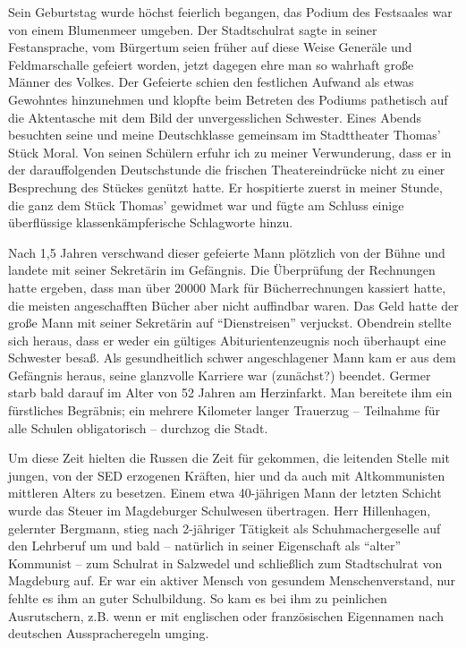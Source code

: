 \documentclass[a5paper,pagesize,10pt,twoside=true]{scrbook}
\renewcommand{\marginpar}[2][]{}
\begin{document}
Sein Geburtstag wurde höchst feierlich begangen, das Podium des Festsaales war von einem Blumenmeer umgeben. Der Stadtschulrat sagte in seiner Festansprache, vom Bürgertum seien früher auf diese Weise Generäle und Feldmarschalle gefeiert worden, jetzt dagegen ehre man so wahrhaft große Männer des Volkes. Der Gefeierte schien den festlichen Aufwand als etwas Gewohntes hinzunehmen und klopfte beim Betreten des Podiums pathetisch auf die Aktentasche mit dem Bild der unvergesslichen Schwester. \marginpar{148} Eines Abends besuchten seine und meine Deutschklasse gemeinsam im Stadttheater Thomas' Stück Moral. Von seinen Schülern erfuhr ich zu meiner Verwunderung, dass er in der darauffolgenden Deutschstunde die frischen Theatereindrücke nicht zu einer Besprechung des Stückes genützt hatte. Er hospitierte zuerst in meiner Stunde, die ganz dem Stück Thomas' gewidmet war und fügte am Schluss einige überflüssige klassenkämpferische Schlagworte hinzu.

Nach 1,5 Jahren verschwand dieser gefeierte Mann plötzlich von der Bühne und landete mit seiner Sekretärin im Gefängnis. Die Überprüfung der Rechnungen hatte ergeben, dass man über \num{20000} Mark für Bücherrechnungen kassiert hatte, die meisten angeschafften Bücher aber nicht auffindbar waren. Das Geld hatte der große Mann mit seiner Sekretärin auf \enquote{Dienstreisen} verjuckst. Obendrein stellte sich heraus, dass er weder ein gültiges Abiturientenzeugnis noch überhaupt eine Schwester besaß. Als gesundheitlich schwer angeschlagener Mann kam er aus dem Gefängnis heraus, seine glanzvolle Karriere war (zunächst?) beendet. Germer starb bald darauf im Alter von 52 Jahren am Herzinfarkt. Man bereitete ihm \marginpar{149} ein fürstliches Begräbnis; ein mehrere Kilometer langer Trauerzug -- Teilnahme für alle Schulen obligatorisch -- durchzog die Stadt.

Um diese Zeit hielten die Russen die Zeit für gekommen, die leitenden Stelle mit jungen, von der SED erzogenen Kräften, hier und da auch mit Altkommunisten mittleren Alters zu besetzen. Einem etwa 40-jährigen Mann der letzten Schicht wurde das Steuer im Magdeburger Schulwesen übertragen. Herr Hillenhagen, gelernter Bergmann, stieg nach 2-jähriger Tätigkeit als Schuhmachergeselle auf den Lehrberuf um und bald -- natürlich in seiner Eigenschaft als \enquote{alter} Kommunist -- zum Schulrat in Salzwedel und schließlich zum Stadtschulrat von Magdeburg auf. Er war ein aktiver Mensch von gesundem Menschenverstand, nur fehlte es ihm an guter Schulbildung. So kam es bei ihm zu peinlichen Ausrutschern, z.B. wenn er mit englischen oder französischen Eigennamen nach deutschen Ausspracheregeln umging.
\end{document}
